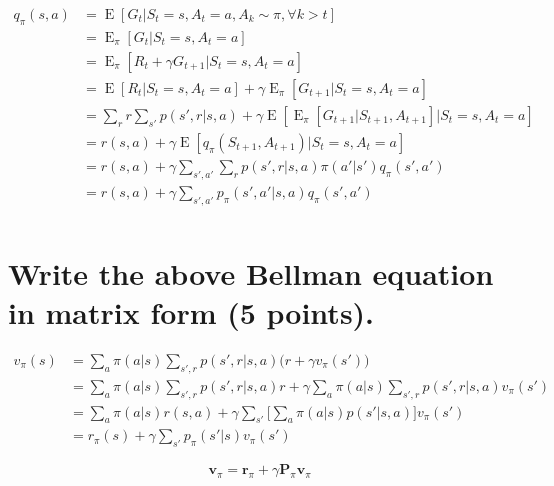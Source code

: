\documentclass[twoside]{article}
\newcommand{\on}{\operatorname}
\newcommand{\E}{\on{E} }
\newcommand{\vpi}{\mathbf{v}_{\pi}}
\newcommand{\rpi}{\mathbf{r}_{\pi}}
\newcommand{\Ppi}{\mathbf{P}_{\pi}}
\begin{document}
\begin{align*}
	q_\pi(s,a) &= \E\left[ G_t | S_t = s, A_t = a, A_k \sim \pi, \forall k > t \right]\\
	&=\E_{\pi}\left[ G_t | S_t = s, A_t = a \right]\\
	&=\E_{\pi}\left[ R_t+\gamma G_{t+1} | S_t = s, A_t = a \right]\\
	&=\E\left[ R_t | S_t = s, A_t = a \right] +\gamma\E_{\pi}\left[ G_{t+1} | S_t = s, A_t = a \right]\\
	&=\sum_r r  \sum_{s'} p(s', r | s, a) + \gamma\E\left[ \E_{\pi}\left[G_{t+1}|S_{t+1}, A_{t+1}\right] | S_t = s, A_t = a \right]\\
	&=r(s,a) + \gamma\E\left[ q_\pi(S_{t+1}, A_{t+1})| S_t = s, A_t = a \right]\\
	&=r(s,a) + \gamma\sum_{s',a'}\sum_r p(s', r| s, a)\pi(a'|s')q_\pi(s',a')\\
	&=r(s,a) + \gamma\sum_{s',a'}p_\pi(s', a'|s, a)q_\pi(s',a')\\
\end{align*}


\section{\normalsize 
Write the above Bellman equation in matrix form
 (5 points).
}

\begin{align*}
	v_{\pi}(s) &= \sum_{a}{\pi(a|s)\sum_{s',r}{p(s',r|s,a)\big(r + \gamma v_{\pi}(s')\big)}}\\
	&= \sum_{a}{\pi(a|s)\sum_{s',r}{p(s',r|s,a)r}} + \gamma\sum_{a}{\pi(a|s)\sum_{s',r}{p(s',r|s,a)v_{\pi}(s')}}\\
	&= \sum_{a}{\pi(a|s)r(s,a)} + \gamma\sum_{s'}{\Big[\sum_{a}{\pi(a|s)p(s'|s,a)}\Big]v_{\pi}(s')}\\
	&= r_{\pi}(s) + \gamma \sum_{s'}{p_{\pi}(s'|s)v_{\pi}(s')}
\end{align*}

\begin{equation*}
\vpi = \rpi + \gamma \Ppi \vpi
\end{equation*}
\end{document}
